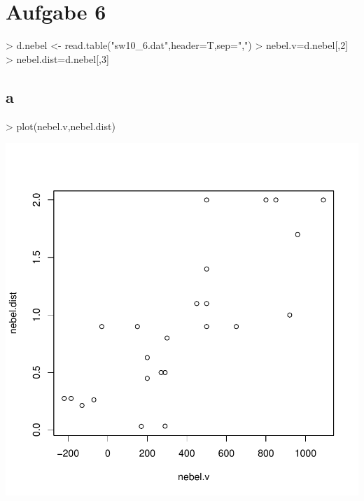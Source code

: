 

\section{Aufgabe 6}
\begin{Schunk}
\begin{Sinput}
> d.nebel <- read.table("sw10_6.dat",header=T,sep=",")
> nebel.v=d.nebel[,2]
> nebel.dist=d.nebel[,3]
\end{Sinput}
\end{Schunk}

\subsection{a}
\begin{Schunk}
\begin{Sinput}
> plot(nebel.v,nebel.dist)
\end{Sinput}
\end{Schunk}
\includegraphics{sw10_6-002}

